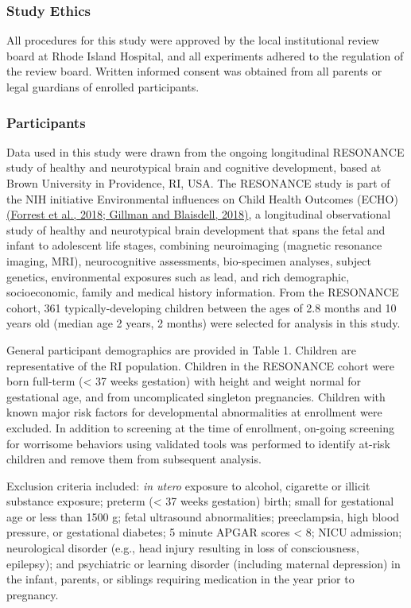 \subsubsection{Study Ethics}

All procedures for this study were approved by the local institutional
review board at Rhode Island Hospital, and all experiments adhered to
the regulation of the review board. Written informed consent was
obtained from all parents or legal guardians of enrolled participants.

\subsubsection{Participants}

Data used in this study were drawn from the ongoing longitudinal
RESONANCE study of healthy and neurotypical brain and cognitive
development, based at Brown University in Providence, RI, USA. The
RESONANCE study is part of the NIH initiative Environmental influences
on Child Health Outcomes (ECHO)
\href{https://www.zotero.org/google-docs/?0tZanX}{(Forrest et al., 2018;
Gillman and Blaisdell, 2018)}, a longitudinal observational study of
healthy and neurotypical brain development that spans the fetal and
infant to adolescent life stages, combining neuroimaging (magnetic
resonance imaging, MRI), neurocognitive assessments, bio-specimen
analyses, subject genetics, environmental exposures such as lead, and
rich demographic, socioeconomic, family and medical history information.
From the RESONANCE cohort, 361 typically-developing children between the
ages of 2.8 months and 10 years old (median age 2 years, 2 months) were
selected for analysis in this study.

General participant demographics are provided in Table 1. Children are
representative of the RI population. Children in the RESONANCE cohort
were born full-term (\textless{} 37 weeks gestation) with height and
weight normal for gestational age, and from uncomplicated singleton
pregnancies. Children with known major risk factors for developmental
abnormalities at enrollment were excluded. In addition to screening at
the time of enrollment, on-going screening for worrisome behaviors using
validated tools was performed to identify at-risk children and remove
them from subsequent analysis.

Exclusion criteria included: \emph{in utero} exposure to alcohol,
cigarette or illicit substance exposure; preterm (\textless{} 37 weeks
gestation) birth; small for gestational age or less than 1500 g; fetal
ultrasound abnormalities; preeclampsia, high blood pressure, or
gestational diabetes; 5 minute APGAR scores \textless{} 8; NICU
admission; neurological disorder (e.g., head injury resulting in loss of
consciousness, epilepsy); and psychiatric or learning disorder
(including maternal depression) in the infant, parents, or siblings
requiring medication in the year prior to pregnancy.

